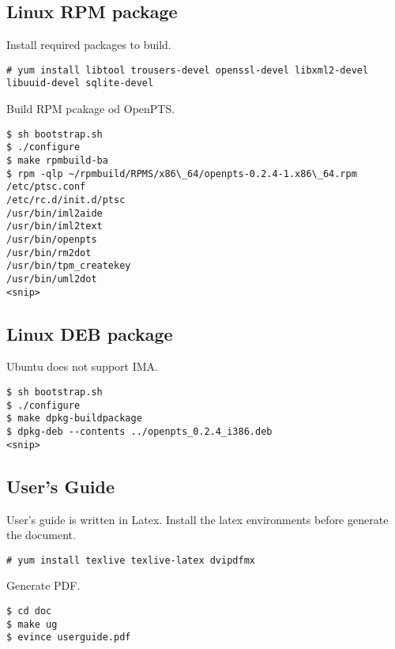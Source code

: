 


\subsection{Linux RPM package} 

Install required packages to build.

\begin{lstlisting}[style=console]
# yum install libtool trousers-devel openssl-devel libxml2-devel libuuid-devel sqlite-devel
\end{lstlisting}

Build RPM pcakage od OpenPTS.

\begin{lstlisting}[style=console]
$ sh bootstrap.sh
$ ./configure
$ make rpmbuild-ba
$ rpm -qlp ~/rpmbuild/RPMS/x86\_64/openpts-0.2.4-1.x86\_64.rpm
/etc/ptsc.conf
/etc/rc.d/init.d/ptsc
/usr/bin/iml2aide
/usr/bin/iml2text
/usr/bin/openpts
/usr/bin/rm2dot
/usr/bin/tpm_createkey
/usr/bin/uml2dot
<snip>
\end{lstlisting}

\subsection{Linux DEB package} 

Ubuntu does not support IMA.

\begin{lstlisting}[style=console]
$ sh bootstrap.sh
$ ./configure
$ make dpkg-buildpackage
$ dpkg-deb --contents ../openpts_0.2.4_i386.deb
<snip>
\end{lstlisting}


\subsection{User's Guide} 

User's guide is written in Latex.
Install the latex environments before generate the document.
\begin{lstlisting}[style=console]
# yum install texlive texlive-latex dvipdfmx
\end{lstlisting}
Generate PDF.
\begin{lstlisting}[style=console]
$ cd doc
$ make ug
$ evince userguide.pdf
\end{lstlisting}


